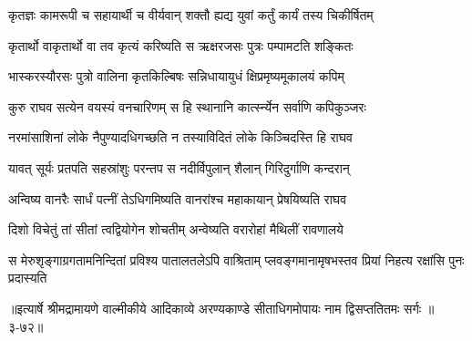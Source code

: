 \twolineshloka
{कृतज्ञः कामरूपी च सहायार्थी च वीर्यवान्}
{शक्तौ ह्यद्य युवां कर्तुं कार्यं तस्य चिकीर्षितम्} %

\twolineshloka
{कृतार्थो वाकृतार्थो वा तव कृत्यं करिष्यति}
{स ऋक्षरजसः पुत्रः पम्पामटति शङ्कितः} %

\twolineshloka
{भास्करस्यौरसः पुत्रो वालिना कृतकिल्बिषः}
{सन्निधायायुधं क्षिप्रमृष्यमूकालयं कपिम्} %

\twolineshloka
{कुरु राघव सत्येन वयस्यं वनचारिणम्}
{स हि स्थानानि कार्त्स्न्येन सर्वाणि कपिकुञ्जरः} %

\twolineshloka
{नरमांसाशिनां लोके नैपुण्यादधिगच्छति}
{न तस्याविदितं लोके किञ्चिदस्ति हि राघव} %

\twolineshloka
{यावत् सूर्यः प्रतपति सहस्रांशुः परन्तप}
{स नदीर्विपुलान् शैलान् गिरिदुर्गाणि कन्दरान्} %

\twolineshloka
{अन्विष्य वानरैः सार्धं पत्नीं तेऽधिगमिष्यति}
{वानरांश्च महाकायान् प्रेषयिष्यति राघव} %

\twolineshloka
{दिशो विचेतुं तां सीतां त्वद्वियोगेन शोचतीम्}
{अन्वेष्यति वरारोहां मैथिलीं रावणालये} %

\twolineshloka
{स मेरुशृङ्गाग्रगतामनिन्दितां प्रविश्य पातालतलेऽपि वाश्रिताम्}
{प्लवङ्गमानामृषभस्तव प्रियां निहत्य रक्षांसि पुनः प्रदास्यति} %


॥इत्यार्षे श्रीमद्रामायणे वाल्मीकीये आदिकाव्ये अरण्यकाण्डे सीताधिगमोपायः नाम द्विसप्ततितमः सर्गः ॥३-७२॥
